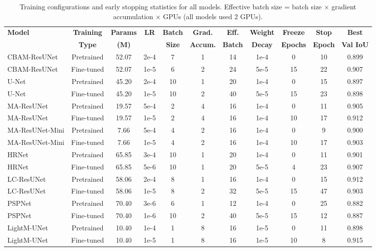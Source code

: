 \documentclass[preprint,12pt]{elsarticle}
\begin{document}
\begin{table}[h]
\centering
\caption{Training configurations and early stopping statistics for all models. Effective batch size = batch size × gradient accumulation × GPUs (all models used 2 GPUs).}
\label{tab:training_params}
\begin{adjustbox}{width=\textwidth}
\begin{tabular}{lcccccccccc}
\toprule
\textbf{Model} & \textbf{Training} & \textbf{Params} & \textbf{LR} & \textbf{Batch} & \textbf{Grad.} & \textbf{Eff.} & \textbf{Weight} & \textbf{Freeze} & \textbf{Stop} & \textbf{Best} \\
 & \textbf{Type} & \textbf{(M)} & & \textbf{Size} & \textbf{Accum.} & \textbf{Batch} & \textbf{Decay} & \textbf{Epochs} & \textbf{Epoch} & \textbf{Val IoU} \\
\midrule
CBAM-ResUNet & Pretrained & 52.07 & 2e-4 & 7 & 1 & 14 & 1e-4 & 0 & 10 & 0.899 \\
CBAM-ResUNet & Fine-tuned & 52.07 & 1e-5 & 6 & 2 & 24 & 5e-5 & 15 & 22 & 0.907 \\
U-Net & Pretrained & 45.20 & 2e-4 & 10 & 1 & 20 & 1e-4 & 0 & 15 & 0.897 \\
U-Net & Fine-tuned & 45.20 & 1e-5 & 10 & 2 & 40 & 5e-5 & 15 & 23 & 0.898 \\
MA-ResUNet & Pretrained & 19.57 & 5e-4 & 2 & 4 & 16 & 1e-4 & 0 & 11 & 0.905 \\
MA-ResUNet & Fine-tuned & 19.57 & 1e-5 & 2 & 4 & 16 & 1e-4 & 10 & 17 & 0.912 \\
MA-ResUNet-Mini & Pretrained & 7.66 & 5e-4 & 4 & 2 & 16 & 1e-4 & 0 & 9 & 0.900 \\
MA-ResUNet-Mini & Fine-tuned & 7.66 & 1e-5 & 4 & 2 & 16 & 1e-4 & 10 & 17 & 0.903 \\
HRNet & Pretrained & 65.85 & 3e-4 & 10 & 1 & 20 & 1e-4 & 0 & 11 & 0.901 \\
HRNet & Fine-tuned & 65.85 & 5e-6 & 10 & 1 & 20 & 5e-5 & 4 & 23 & 0.907 \\
LC-ResUNet & Pretrained & 58.06 & 2e-4 & 8 & 1 & 16 & 1e-4 & 0 & 15 & 0.912 \\
LC-ResUNet & Fine-tuned & 58.06 & 1e-5 & 8 & 2 & 32 & 5e-5 & 15 & 47 & 0.903 \\
PSPNet & Pretrained & 70.40 & 3e-6 & 6 & 1 & 12 & 1e-4 & 0 & 25 & 0.882 \\
PSPNet & Fine-tuned & 70.40 & 1e-6 & 10 & 2 & 40 & 5e-5 & 15 & 12 & 0.887 \\
LightM-UNet & Pretrained & 10.40 & 1e-4 & 1 & 8 & 16 & 1e-5 & 0 & 11 & 0.898 \\
LightM-UNet & Fine-tuned & 10.40 & 1e-5 & 1 & 8 & 16 & 1e-5 & 10 & 8 & 0.915 \\
\bottomrule
\end{tabular}
\end{adjustbox}
\end{table}
\end{document}
